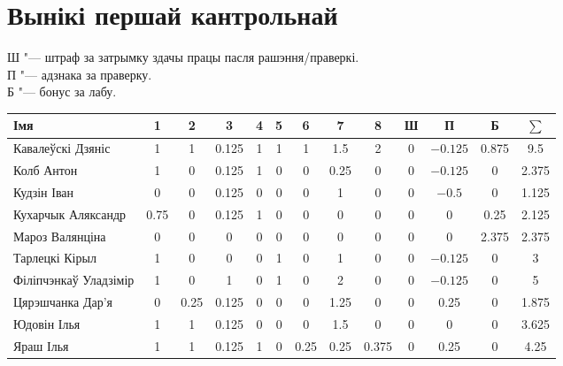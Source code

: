 \documentclass[12pt, a4paper]{extarticle}
\begin{document}
	\section{Вынікі першай кантрольнай}
	\noindent Ш "--- штраф за затрымку здачы працы пасля рашэння/праверкі. \\
	П "--- адзнака за праверку. \\
	Б "--- бонус за лабу.
	\begin{table}[H]
	    \begin{tabular}{|l|c|c|c|c|c|c|c|c|c|c|c|c|}
	        \hline
	   		Імя                   &  1   &  2   &   3   & 4 & 5 &  6   &  7   &   8   & Ш &    П     &   Б   & $\sum$ \\ \hline
	   		Кавалеўскі Дзяніс     &  1   &  1   & 0.125 & 1 & 1 &  1   &  1.5 &   2   & 0 & $-0.125$ & 0.875 &   9.5  \\ \hline
	   		Колб Антон            &  1   &  0   & 0.125 & 1 & 0 &  0   & 0.25 &   0   & 0 & $-0.125$ &   0   &  2.375 \\ \hline
	   		Кудзін Іван           &  0   &  0   & 0.125 & 0 & 0 &  0   &  1   &   0   & 0 &  $-0.5$  &   0   &  1.125 \\ \hline
	   		Кухарчык Аляксандр    & 0.75 &  0   & 0.125 & 1 & 0 &  0   &  0   &   0   & 0 &    0     &  0.25 &  2.125 \\ \hline
	   		Мароз Валянціна       &  0   &  0   &   0   & 0 & 0 &  0   &  0   &   0   & 0 &    0     & 2.375 &  2.375 \\ \hline
	   		Тарлецкі Кірыл        &  1   &  0   &   0   & 0 & 1 &  0   &  1   &   0   & 0 & $-0.125$ &   0   &   3    \\ \hline
	   		Філіпчэнкаў Уладзімір &  1   &  0   &   1   & 0 & 1 &  0   &  2   &   0   & 0 & $-0.125$ &   0   &   5    \\ \hline
	   		Цярэшчанка Дар'я      &  0   & 0.25 & 0.125 & 0 & 0 &  0   & 1.25 &   0   & 0 &   0.25   &   0   &  1.875 \\ \hline
	   		Юдовін Ілья           &  1   &  1   & 0.125 & 0 & 0 &  0   &  1.5 &   0   & 0 &    0     &   0   &  3.625 \\ \hline
	   		Яраш Ілья             &  1   &  1   & 0.125 & 1 & 0 & 0.25 & 0.25 & 0.375 & 0 &   0.25   &   0   &  4.25  \\ \hline
		\end{tabular}
	\end{table}
\end{document}
